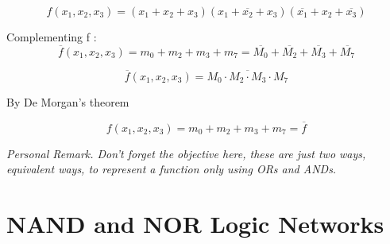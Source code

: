 \documentclass[12pt,openany]{book}
\begin{document}
			      	\[
			      		f(x_1, x_2, x_3) = (x_1 + x_2 + x_3)(x_1 + \overline{x_2} + x_3)(\overline{x_1} + x_2 + \overline{x_3})
			      	\]
			      	
			      	
			      	Complementing f :
			      	\[
			      		\overline{f}(x_1, x_2, x_3) = m_0 + m_2 + m_3 + m_7 = \overline{M_0} + \overline{M_2} + \overline{M_3} + \overline{M_7}
			      	\]
			      	
			      	\[
			      		\overline{f}(x_1, x_2, x_3) = \overline{M_0 \cdot M_2 \cdot M_3 \cdot M_7}
			      	\]
			      	
			      	By De Morgan's theorem
			      	
			      	\[
			      		f(x_1, x_2, x_3) = m_0 + m_2 + m_3 + m_7 = \overline{f}
			      	\]
			      	
			      	\textit{Personal Remark. Don't forget the objective here, these are just two ways, equivalent ways, to represent a function only using ORs and ANDs.}
			      	
			      	\section{NAND and NOR Logic Networks}
			      	
			      	
\end{document}

